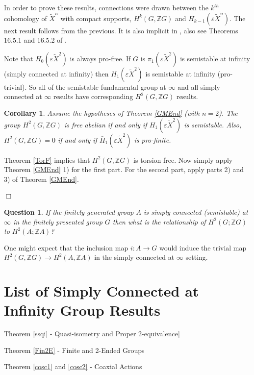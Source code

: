 \documentclass[12pt]{article}
\newtheorem{corollary}[theorem]{Corollary}
\newtheorem{question}[theorem]{Question}
\newenvironment{proof}{\addvspace{12pt}\noindent{\bf Proof:}}{
$\Box$\par\addvspace{12pt}}
\begin{document}
In order to prove these results, connections were drawn between the $k^{th}$ cohomology of $\tilde X^n$ with compact supports, $H^k(G,\mathbb ZG)$ and $H_{k-1}(\varepsilon \tilde X^n)$. The next result follows from the previous. It is also implicit in \cite{Ho77}, also see Theorems 16.5.1 and 16.5.2 of \cite{G}.

Note that $H_0(\varepsilon \tilde X^2)$ is always pro-free. If $G$ is $\pi_1(\varepsilon \tilde X^2)$ is semistable at infinity (simply connected at infinity) then $H_1(\varepsilon \tilde X^2)$ is semistable at infinity (pro-trivial). 
So all of the semistable fundamental group at $\infty$ and all simply connected at $\infty$ results have corresponding $H^2(G,\mathbb ZG)$ results. 

\begin{corollary} \label{GM2} 
Assume the hypotheses of Theorem \ref{GMEnd} (with $n=2$). The group $H^2(G,\mathbb ZG)$ is free abelian if and only if $ H_1(\varepsilon\tilde X^2)$ is semistable.  Also, $H^2(G,\mathbb ZG)=0$ if and only if $\bar H_1(\varepsilon \tilde X^2)$ is pro-finite. 
\end{corollary}
\begin{proof}
Theorem \ref{TorF} implies that $H^2(G,\mathbb ZG)$ is torsion free. Now simply apply Theorem \ref{GMEnd} 1) for the first part. For the second part, apply parts 2) and 3) of Theorem \ref{GMEnd}. 
\end{proof}

\begin{question} If the finitely generated group $A$ is simply connected (semistable) at $\infty$ in the finitely presented group $G$ then what is the relationship of $H^2(G;\mathbb ZG)$ to  $H^2(A;\mathbb ZA)$?
\end{question}

One might expect that the inclusion map $i:A\to G$  would induce the trivial map $H^2(G,\mathbb ZG)\to H^2(A,\mathbb ZA)$ in the simply connected at $\infty$ setting. 
\newpage

\section{List of Simply Connected at Infinity Group Results}\label{LSCIR}
 
 
Theorem \ref{ssqi} - Quasi-isometry and Proper 2-equivalence]

Theorem \ref{Fin2E} - Finite and 2-Ended Groups

Theorem \ref{cosc1} and \ref{cosc2} - Coaxial Actions
\end{document}
